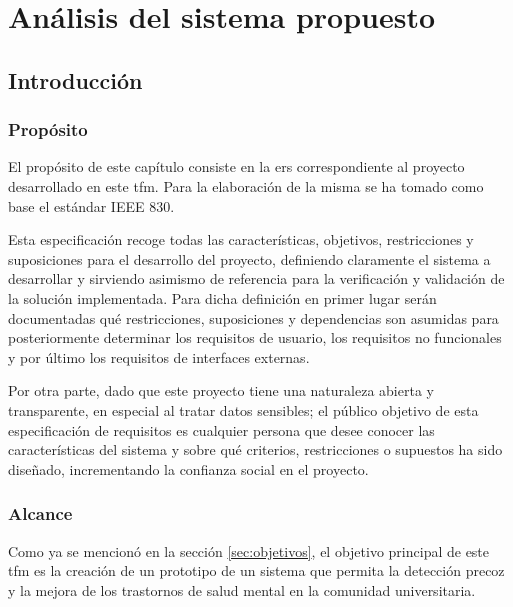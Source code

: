 \chapter{Análisis del sistema propuesto}
\label{chapter:analisis}


\section{Introducción}

    \subsection{Propósito}
        El propósito de este capítulo consiste en la \gls{ers} correspondiente al proyecto desarrollado en este \gls{tfm}. Para la elaboración de la misma se ha tomado como base el estándar IEEE 830.

        Esta especificación recoge todas las características, objetivos, restricciones y suposiciones para el desarrollo del proyecto, definiendo claramente el sistema a desarrollar y sirviendo asimismo de referencia para la verificación y validación de la solución implementada. Para dicha definición en primer lugar serán documentadas qué restricciones, suposiciones y dependencias son asumidas para posteriormente determinar los requisitos de usuario, los requisitos no funcionales y por último los requisitos de interfaces externas.


        Por otra parte, dado que este proyecto tiene una naturaleza abierta y transparente, en especial al tratar datos sensibles; el público objetivo de esta especificación de requisitos es cualquier persona que desee conocer las características del sistema y sobre qué criterios, restricciones o supuestos ha sido diseñado, incrementando la confianza social en el proyecto.
        
    \subsection{Alcance}
        Como ya se mencionó en la sección \ref{sec:objetivos}, el objetivo principal de este \gls{tfm} es la creación de un prototipo de un sistema que permita la detección precoz y la mejora de los trastornos de salud mental en la comunidad universitaria. 

